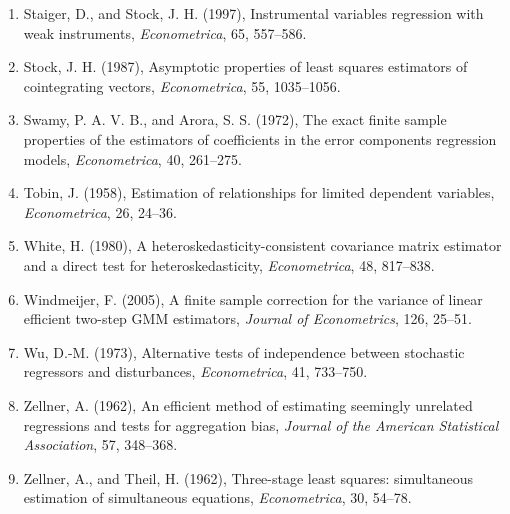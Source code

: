 \documentclass[11pt,a4paper]{article}
\numberwithin{equation}{section}
\theoremstyle{definition}
\begin{document}
\begin{enumerate}
\item Staiger, D., and Stock, J. H. (1997), Instrumental variables regression with weak instruments, \emph{Econometrica}, 65, 557--586.
\item Stock, J. H. (1987), Asymptotic properties of least squares estimators of cointegrating vectors, \emph{Econometrica}, 55, 1035--1056.
\item Swamy, P. A. V. B., and Arora, S. S. (1972), The exact finite sample properties of the estimators of coefficients in the error components
regression models, \emph{Econometrica}, 40, 261--275.
\item Tobin, J. (1958), Estimation of relationships for limited dependent variables, \emph{Econometrica}, 26, 24--36.
\item White, H. (1980), A heteroskedasticity-consistent covariance matrix estimator and a direct test for heteroskedasticity, \emph{Econometrica},
48, 817--838.
\item Windmeijer, F. (2005), A finite sample correction for the variance of linear efficient two-step GMM estimators, \emph{Journal of
Econometrics}, 126, 25--51.
\item Wu, D.-M. (1973), Alternative tests of independence between stochastic regressors and disturbances, \emph{Econometrica}, 41, 733--750.
\item Zellner, A. (1962), An efficient method of estimating seemingly unrelated regressions and tests for aggregation bias, \emph{Journal of the
American Statistical Association}, 57, 348--368.
\item Zellner, A., and Theil, H. (1962), Three-stage least squares: simultaneous estimation of simultaneous equations, \emph{Econometrica}, 30,
54--78.
\end{enumerate}
\end{document}
